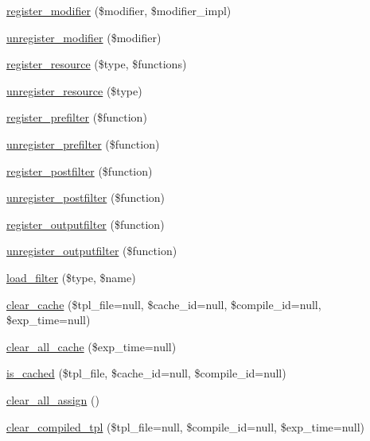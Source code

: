 \begin{DoxyCompactItemize}
\item 
\mbox{\hyperlink{class_smarty_ac1483efc4d74e159c9ddb29b33fbfcc0}{register\+\_\+modifier}} (\$modifier, \$modifier\+\_\+impl)
\item 
\mbox{\hyperlink{class_smarty_aa0efdcad7fc5a36846e5e8bd8a455dd9}{unregister\+\_\+modifier}} (\$modifier)
\item 
\mbox{\hyperlink{class_smarty_a27683a72840c9401cde24eec57d493df}{register\+\_\+resource}} (\$type, \$functions)
\item 
\mbox{\hyperlink{class_smarty_a509d4408ce20f6def85118984b81a32e}{unregister\+\_\+resource}} (\$type)
\item 
\mbox{\hyperlink{class_smarty_afdd4dead058273890d629d207f236239}{register\+\_\+prefilter}} (\$function)
\item 
\mbox{\hyperlink{class_smarty_a8208fd226842f48de08ce37305295d64}{unregister\+\_\+prefilter}} (\$function)
\item 
\mbox{\hyperlink{class_smarty_a1eb31d2b852e5862a3d04284614d145b}{register\+\_\+postfilter}} (\$function)
\item 
\mbox{\hyperlink{class_smarty_a36d917f9b975efc48682198c705eb244}{unregister\+\_\+postfilter}} (\$function)
\item 
\mbox{\hyperlink{class_smarty_a54426aae9228293c47e05f4ceaacd516}{register\+\_\+outputfilter}} (\$function)
\item 
\mbox{\hyperlink{class_smarty_a8d7427d8dc5f3d71aeb3385b9aad3700}{unregister\+\_\+outputfilter}} (\$function)
\item 
\mbox{\hyperlink{class_smarty_ad642cca94486c492c56071fb32a3421c}{load\+\_\+filter}} (\$type, \$name)
\item 
\mbox{\hyperlink{class_smarty_a6b5412f074996dea92d89b32a13880d8}{clear\+\_\+cache}} (\$tpl\+\_\+file=null, \$cache\+\_\+id=null, \$compile\+\_\+id=null, \$exp\+\_\+time=null)
\item 
\mbox{\hyperlink{class_smarty_aaf1eab6e680746ae852abfc3814382fb}{clear\+\_\+all\+\_\+cache}} (\$exp\+\_\+time=null)
\item 
\mbox{\hyperlink{class_smarty_a70d12433755791c1383f394b6a41271d}{is\+\_\+cached}} (\$tpl\+\_\+file, \$cache\+\_\+id=null, \$compile\+\_\+id=null)
\item 
\mbox{\hyperlink{class_smarty_a47a576000a48c74fea66a209d7f0ac21}{clear\+\_\+all\+\_\+assign}} ()
\item 
\mbox{\hyperlink{class_smarty_a71153cdee03c4dcb864488b59442b162}{clear\+\_\+compiled\+\_\+tpl}} (\$tpl\+\_\+file=null, \$compile\+\_\+id=null, \$exp\+\_\+time=null)

\end{DoxyCompactItemize}

